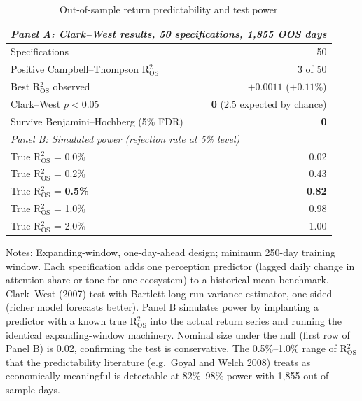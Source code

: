 \documentclass[12pt,a4paper]{article}
\begin{document}
\begin{table}[H]
\centering
\caption{Out-of-sample return predictability and test power}
\label{tab:efficiency_power}
\begin{threeparttable}
\begin{tabular}{lr}
\toprule
\multicolumn{2}{l}{\textit{Panel A: Clark--West results, 50 specifications, 1,855 OOS days}} \\
\midrule
Specifications & 50 \\
Positive Campbell--Thompson R$^2_{\text{OS}}$ & 3 of 50 \\
Best R$^2_{\text{OS}}$ observed & $+0.0011$ ($+0.11\%$) \\
Clark--West $p < 0.05$ & \textbf{0} \quad (2.5 expected by chance) \\
Survive Benjamini--Hochberg (5\% FDR) & \textbf{0} \\
\midrule
\multicolumn{2}{l}{\textit{Panel B: Simulated power (rejection rate at 5\% level)}} \\
\midrule
True R$^2_{\text{OS}}$ = 0.0\% & 0.02 \\
True R$^2_{\text{OS}}$ = 0.2\% & 0.43 \\
True R$^2_{\text{OS}}$ = \textbf{0.5\%} & \textbf{0.82} \\
True R$^2_{\text{OS}}$ = 1.0\% & 0.98 \\
True R$^2_{\text{OS}}$ = 2.0\% & 1.00 \\
\bottomrule
\end{tabular}
\begin{tablenotes}
\small
\item Notes: Expanding-window, one-day-ahead design; minimum 250-day training window. Each specification adds one perception predictor (lagged daily change in attention share or tone for one ecosystem) to a historical-mean benchmark. Clark--West (2007) test with Bartlett long-run variance estimator, one-sided (richer model forecasts better). Panel B simulates power by implanting a predictor with a known true R$^2_{\text{OS}}$ into the actual return series and running the identical expanding-window machinery. Nominal size under the null (first row of Panel B) is 0.02, confirming the test is conservative. The 0.5\%--1.0\% range of R$^2_{\text{OS}}$ that the predictability literature (e.g.\ Goyal and Welch 2008) treats as economically meaningful is detectable at 82\%--98\% power with 1,855 out-of-sample days.
\end{tablenotes}
\end{threeparttable}
\end{table}
\end{document}
